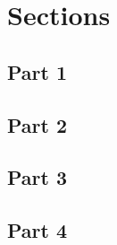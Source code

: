 \section{Sections}

\subsection{Part 1}
\subsection{Part 2}
\subsection{Part 3}
\subsection{Part 4}
